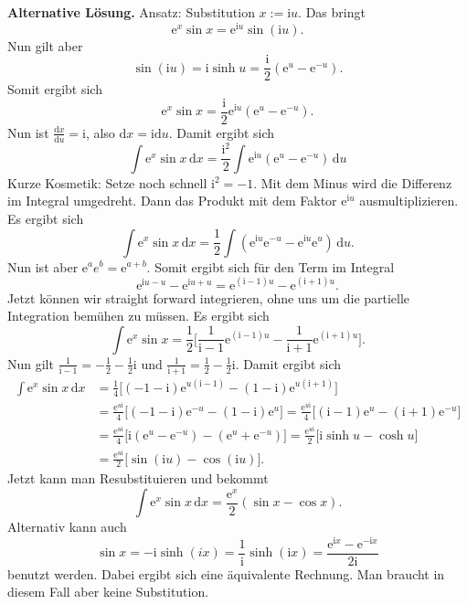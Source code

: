 \documentclass[a4paper,10pt,fleqn,twoside]{scrartcl}
\numberwithin{equation}{section}
\newcommand{\ui}{\mathrm i}
\newcommand{\ee}{\mathrm e}
\newcommand{\strong}[1]{{\sf\bfseries #1}}
\theoremstyle{Aufgabe}
\begin{document}
\strong{Alternative Lösung.}
Ansatz: Substitution $x:=\ui u$. Das bringt
\begin{equation}
\ee^x\sin x = \ee^{\ui u}\sin(\ui u).
\end{equation}
Nun gilt aber
\begin{equation}
\sin(\ui u)=\ui\sinh u = \frac{\ui}{2}(\ee^u-\ee^{-u}).
\end{equation}
Somit ergibt sich
\begin{equation}
\ee^x\sin x = \frac{\ui}{2}\ee^{\ui u}(\ee^u-\ee^{-u}).
\end{equation}
Nun ist $\frac{\mathrm dx}{\mathrm du}=\ui$, also
$\mathrm dx=\ui\mathrm du$. Damit ergibt sich
\begin{equation}
\int \ee^x\sin x\,\mathrm dx
= \frac{\ui^2}{2}\int \ee^{\ui u}(\ee^u-\ee^{-u})\,\mathrm du
\end{equation}
Kurze Kosmetik: Setze noch schnell $\ui^2=-1$. Mit dem Minus wird
die Differenz im Integral umgedreht. Dann das Produkt mit dem
Faktor $\ee^{\ui u}$ ausmultiplizieren. Es ergibt sich
\begin{equation}
\int \ee^x\sin x\,\mathrm dx
= \frac{1}{2}\int (\ee^{\ui u}\ee^{-u}-\ee^{\ui u}\ee^u)\,\mathrm du.
\end{equation}
Nun ist aber $\ee^a e^b=\ee^{a+b}$. Somit ergibt sich
für den Term im Integral
\begin{equation}
\ee^{\ui u-u}-\ee^{\ui u+u} = \ee^{(\ui-1)u}-\ee^{(\ui+1)u}.
\end{equation}
Jetzt können wir straight forward integrieren, ohne uns um
die partielle Integration bemühen zu müssen. Es ergibt sich
\begin{equation}
\int \ee^x\sin x
= \frac{1}{2}\bigg[
\frac{1}{\ui-1}\ee^{(\ui-1)u}-\frac{1}{\ui+1}\ee^{(\ui+1)u}
\bigg].
\end{equation}
Nun gilt $\frac{1}{\ui-1}=-\frac{1}{2}-\frac{1}{2}\ui$ und
$\frac{1}{\ui+1} = \frac{1}{2}-\frac{1}{2}\ui$. Damit ergibt sich
\begin{align}
\int \ee^x\sin x\,\mathrm dx
&= \frac{1}{4}\Big[(-1-\ui)\ee^{u(\ui-1)}-(1-\ui)\ee^{u(\ui+1)}\Big]\\
&= \frac{\ee^{u\ui}}{4}\Big[(-1-\ui)\ee^{-u}-(1-\ui)\ee^u\Big]
= \frac{\ee^{u\ui}}{4}\Big[(\ui-1)\ee^u-(\ui+1)\ee^{-u}\Big]\\
&= \frac{\ee^{u\ui}}{4}\Big[\ui(\ee^u-\ee^{-u})-(\ee^u+\ee^{-u})\Big]
= \frac{\ee^{u\ui}}{2}\Big[\ui\sinh u-\cosh u\Big]\\
&= \frac{\ee^{u\ui}}{2}\Big[\sin(\ui u)-\cos(\ui u)\Big].
\end{align}
Jetzt kann man Resubstituieren und bekommt
\begin{equation}
\int \ee^x\sin x\,\mathrm dx = \frac{\ee^x}{2}(\sin x-\cos x).
\end{equation}
Alternativ kann auch
\begin{equation}
\sin x = -\ui\sinh(ix) = \frac{1}{\ui}\sinh(\ui x)
=\frac{\ee^{\ui x}-\ee^{-\ui x}}{2\ui}
\end{equation}
benutzt werden. Dabei ergibt sich eine äquivalente
Rechnung. Man braucht in diesem Fall aber keine Substitution.
\end{document}
